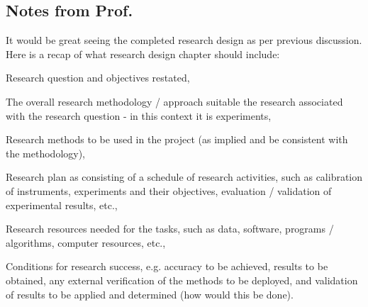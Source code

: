\subsection{Notes from Prof.}
It would be great seeing the completed research design as per previous discussion.
Here is a recap of what research design chapter should include: 
\begin{todolist}
    \item[\done] Research question and objectives restated, 
    \item[\done] The overall research methodology / approach suitable the research associated with the research question - in this context it is experiments, 
    \item Research methods to be used in the project (as implied and be consistent with the methodology), 
    \item[\done] Research plan as consisting of a schedule of research activities, such as calibration of instruments, experiments and their objectives, evaluation / validation of experimental results, etc., 
    \item[\done] Research resources needed for the tasks, such as data, software, programs / algorithms, computer resources, etc., 
    \item[\done] Conditions for research success, e.g. accuracy to be achieved, results to be obtained, any external verification of the methods to be deployed, and validation of results to be applied and determined (how would this be done).
\end{todolist}